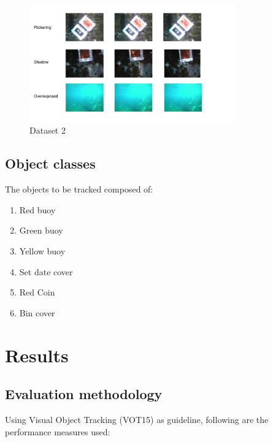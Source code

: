 \documentclass[fypca]{socreport}
\begin{document}
\begin{figure}[H]
\centering
  \includegraphics[width=0.8\textwidth, height=0.3\textheight]{data2.png}
  \caption{Dataset 2}
  \label{fig:dataset2}
\end{figure}

\subsection{Object classes}

The objects to be tracked composed of:

\begin{enumerate}
  \item Red buoy
  \item Green buoy
  \item Yellow buoy
  \item Set date cover
  \item Red Coin
  \item Bin cover
\end{enumerate}

\section{Results}

\subsection{Evaluation methodology}

Using Visual Object Tracking (VOT15)  as guideline,
following are the performance measures used:
\end{document}
